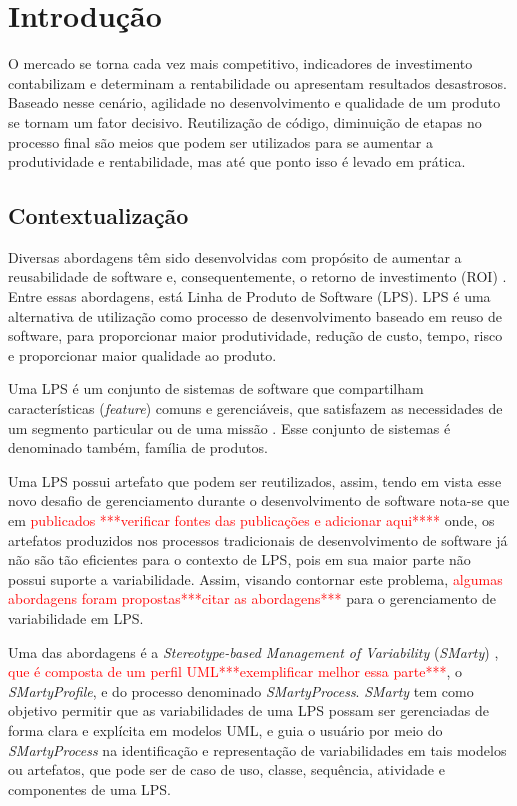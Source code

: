 \chapter{Introdução}
\label{sec:introducao}
\pagestyle{plain}

O mercado se torna cada vez mais competitivo, indicadores de investimento contabilizam e determinam a rentabilidade ou apresentam resultados desastrosos. Baseado nesse cenário, agilidade no desenvolvimento e qualidade de um produto se tornam um fator decisivo. Reutilização de código, diminuição de etapas no processo final são meios que podem ser utilizados para se aumentar a produtividade e rentabilidade, mas até que ponto isso é levado em prática. 
\section{Contextualização}
Diversas abordagens têm sido desenvolvidas com propósito de aumentar a reusabilidade de software e, consequentemente, o retorno de investimento (ROI) \cite{delamaro2017introduccao}. Entre essas abordagens, está Linha de Produto de Software (LPS). LPS é uma alternativa de utilização como processo de desenvolvimento baseado em reuso de software, para proporcionar maior produtividade, redução de custo, tempo, risco e proporcionar maior qualidade ao produto.

Uma LPS é um conjunto de sistemas de software que compartilham características (\textit{feature}) comuns e gerenciáveis, que satisfazem as necessidades de um segmento particular ou de uma missão \cite{clements2002software}. Esse conjunto de sistemas é denominado também, família de produtos.

Uma LPS possui artefato que podem ser reutilizados, assim, tendo em vista esse novo desafio de gerenciamento durante o desenvolvimento de software nota-se que em \textcolor{red}{publicados ***verificar fontes das publicações e adicionar aqui****} onde, os artefatos produzidos nos processos tradicionais de desenvolvimento de software já não são tão eficientes para o contexto de LPS, pois em sua maior parte não possui suporte a variabilidade. Assim, visando contornar este problema, \textcolor{red}{algumas abordagens foram propostas***citar as abordagens***} para o gerenciamento de variabilidade em LPS.

Uma das abordagens é a \textit{Stereotype-based Management of Variability} (\textit{SMarty}) \cite{junior2010systematic} , \textcolor{red}{que é composta de um perfil UML***exemplificar melhor essa parte***}, o \textit{SMartyProfile}, e do processo denominado \textit{SMartyProcess}. \textit{SMarty} tem como objetivo permitir que as variabilidades de uma LPS possam ser gerenciadas de forma clara e explícita em modelos UML, e guia o usuário por meio do \textit{SMartyProcess} na identificação e representação de variabilidades em tais modelos ou artefatos, que pode ser de caso de uso, classe, sequência, atividade e componentes de uma LPS.

